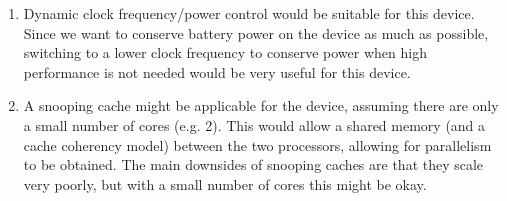 \begin{enumerate}[label=(\alph*)]
\begin{enumerate}[label=(\roman*)]
      \item
        Dynamic clock frequency/power control would be suitable for this device. Since we want to conserve battery power on the device as much as possible, switching to a lower clock frequency to conserve power when high performance is not needed would be very useful for this device.

      \item
        A snooping cache might be applicable for the device, assuming there are only a small number of cores (e.g. 2). This would allow a shared memory (and a cache coherency model) between the two processors, allowing for parallelism to be obtained. The main downsides of snooping caches are that they scale very poorly, but with a small number of cores this might be okay.
        
    \end{enumerate}
        
    \end{enumerate}

